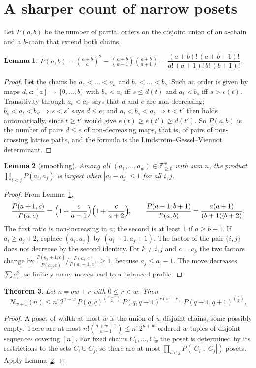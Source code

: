 \documentclass[11pt]{article}
\newtheorem{theorem}{Theorem}
\newtheorem{lemma}[theorem]{Lemma}
\theoremstyle{definition}
\theoremstyle{remark}
\begin{document}
\section{A sharper count of narrow posets}

Let $P(a,b)$ be the number of partial orders on the disjoint union of an $a$-chain and a
$b$-chain that extend both chains.

\begin{lemma}\label{lem:two}
$P(a,b)=\binom{a+b}{a}^2-\binom{a+b}{a-1}\binom{a+b}{a+1}
=\dfrac{(a+b)!\,(a+b+1)!}{a!\,(a+1)!\,b!\,(b+1)!}$.
\end{lemma}
\begin{proof}
Let the chains be $a_1<\dots<a_a$ and $b_1<\dots<b_b$. Such an order is given by maps
$d,e\colon[a]\to\{0,\dots,b\}$ with $b_s<a_t$ iff $s\le d(t)$ and $a_t<b_s$ iff $s>e(t)$.
Transitivity through $a_t<a_{t'}$ says that $d$ and $e$ are non-decreasing;
$b_s<a_t<b_{s'}\Rightarrow s<s'$ says $d\le e$; and $a_t<b_s<a_{t'}\Rightarrow t<t'$ then
holds automatically, since $t\ge t'$ would give $e(t)\ge e(t')\ge d(t')$. So $P(a,b)$ is the
number of pairs $d\le e$ of non-decreasing maps, that is, of pairs of non-crossing lattice
paths, and the formula is the Lindstr\"om--Gessel--Viennot determinant.
\end{proof}

\begin{lemma}[smoothing]\label{lem:smooth}
Among all $(a_1,\dots,a_w)\in\mathbb{Z}_{\ge0}^w$ with sum $n$, the product
$\prod_{i<j}P(a_i,a_j)$ is largest when $|a_i-a_j|\le1$ for all $i,j$.
\end{lemma}
\begin{proof}
From Lemma~\ref{lem:two},
\[
\frac{P(a+1,c)}{P(a,c)}=\Bigl(1+\frac{c}{a+1}\Bigr)\Bigl(1+\frac{c}{a+2}\Bigr),\qquad
\frac{P(a-1,b+1)}{P(a,b)}=\frac{a(a+1)}{(b+1)(b+2)} .
\]
The first ratio is non-increasing in $a$; the second is at least $1$ if $a\ge b+1$.
If $a_i\ge a_j+2$, replace $(a_i,a_j)$ by $(a_i-1,a_j+1)$. The factor of the pair $\{i,j\}$
does not decrease by the second identity. For $k\ne i,j$ and $c=a_k$ the two factors change
by $\frac{P(a_j+1,c)}{P(a_j,c)}\big/\frac{P(a_i,c)}{P(a_i-1,c)}\ge1$, because
$a_j\le a_i-1$. The move decreases $\sum a_i^2$, so finitely many moves lead to a balanced
profile.
\end{proof}

\begin{theorem}\label{thm:narrow}
Let $n=qw+r$ with $0\le r<w$. Then
\[
N_{w+1}(n)\le n!\,2^{n+w}\,P(q,q)^{\binom{w-r}{2}}\,P(q,q+1)^{r(w-r)}\,P(q+1,q+1)^{\binom r2}.
\]
\end{theorem}
\begin{proof}
A poset of width at most $w$ is the union of $w$ disjoint chains, some possibly empty. There
are at most $n!\binom{n+w-1}{w-1}\le n!\,2^{n+w}$ ordered $w$-tuples of disjoint sequences
covering $[n]$. For fixed chains $C_1,\dots,C_w$ the poset is determined by its restrictions
to the sets $C_i\cup C_j$, so there are at most $\prod_{i<j}P(|C_i|,|C_j|)$ posets.
Apply Lemma~\ref{lem:smooth}.
\end{proof}
\end{document}
